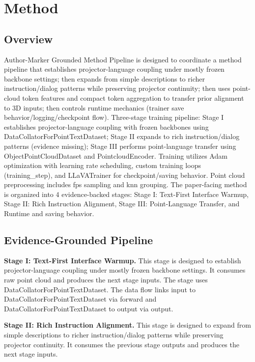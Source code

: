 \section{Method}

\subsection{Overview}
Author-Marker Grounded Method Pipeline is designed to coordinate a method pipeline that establishes projector-language coupling under mostly frozen backbone settings; then expands from simple descriptions to richer instruction/dialog patterns while preserving projector continuity; then uses point-cloud token features and compact token aggregation to transfer prior alignment to 3D inputs; then controls runtime mechanics (trainer save behavior/logging/checkpoint flow). Three-stage training pipeline: Stage I establishes projector-language coupling with frozen backbones using DataCollatorForPointTextDataset; Stage II expands to rich instruction/dialog patterns (evidence missing); Stage III performs point-language transfer using ObjectPointCloudDataset and PointcloudEncoder. Training utilizes Adam optimization with learning rate scheduling, custom training loops (training\_step), and LLaVATrainer for checkpoint/saving behavior. Point cloud preprocessing includes fps sampling and knn grouping. The paper-facing method is organized into 4 evidence-backed stages: Stage I: Text-First Interface Warmup, Stage II: Rich Instruction Alignment, Stage III: Point-Language Transfer, and Runtime and saving behavior.

\subsection{Evidence-Grounded Pipeline}
\textbf{Stage I: Text-First Interface Warmup.} This stage is designed to establish projector-language coupling under mostly frozen backbone settings. It consumes raw point cloud and produces the next stage inputs. The stage uses DataCollatorForPointTextDataset. The data flow links input to DataCollatorForPointTextDataset via forward and DataCollatorForPointTextDataset to output via output.

\textbf{Stage II: Rich Instruction Alignment.} This stage is designed to expand from simple descriptions to richer instruction/dialog patterns while preserving projector continuity. It consumes the previous stage outputs and produces the next stage inputs.

